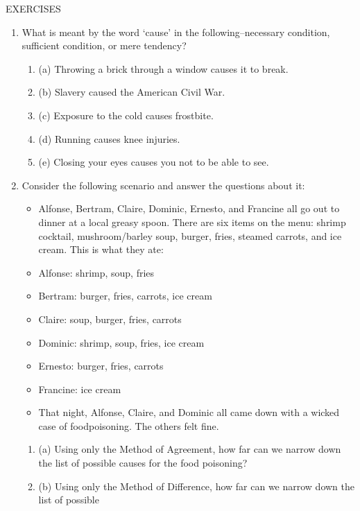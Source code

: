 EXERCISES \\

\begin{enumerate}
\item What is meant by the word `cause' in the following--necessary condition, sufficient condition,
or mere tendency?
\begin{enumerate}
\item (a) Throwing a brick through a window causes it to break.
\item (b) Slavery caused the American Civil War.
\item (c) Exposure to the cold causes frostbite.
\item (d) Running causes knee injuries.
\item (e) Closing your eyes causes you not to be able to see.
\end{enumerate}
\item Consider the following scenario and answer the questions about it:
\begin{itemize}
\item Alfonse, Bertram, Claire, Dominic, Ernesto, and Francine all go out to dinner at a local
greasy spoon. There are six items on the menu: shrimp cocktail, mushroom/barley soup,
burger, fries, steamed carrots, and ice cream. This is what they ate:
\end{itemize}
\begin{itemize}
\item Alfonse: shrimp, soup, fries
\item Bertram: burger, fries, carrots, ice cream
\item Claire: soup, burger, fries, carrots
\item Dominic: shrimp, soup, fries, ice cream
\item Ernesto: burger, fries, carrots
\item Francine: ice cream
\end{itemize}
\begin{itemize}
\item That night, Alfonse, Claire, and Dominic all came down with a wicked case of foodpoisoning. The others felt fine.
\end{itemize}
\begin{enumerate}
\item (a) Using only the Method of Agreement, how far can we narrow down the list of possible
causes for the food poisoning?
\item (b) Using only the Method of Difference, how far can we narrow down the list of possible

\end{enumerate}
\end{enumerate}
